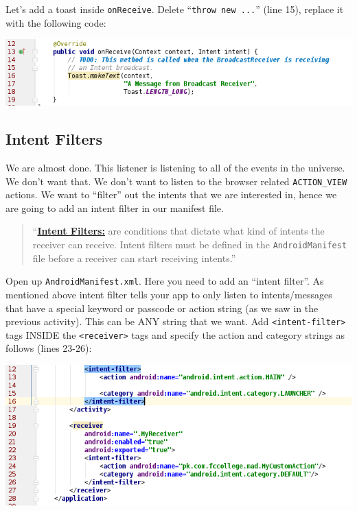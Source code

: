 Let's add a toast inside \texttt{onReceive}. Delete ``\texttt{throw new ...}'' (line 15), replace it with the following code:

\begin{center}
	\includegraphics[scale=0.4]{chapters/ch09/images/33}
\end{center}

\subsection{Intent Filters}
We are almost done. This listener is listening to all of the events in the universe. We don't want that. We don't want to listen to the browser related \texttt{ACTION\_VIEW} actions. We want to ``filter'' out the intents that we are interested in, hence we are going to add an intent filter in our manifest file.

\begin{quote}
	``\href{https://developer.android.com/guide/components/intents-filters.html#Receiving}{\textbf{Intent Filters:}} are conditions that dictate what kind of intents the receiver can receive. Intent filters must be defined in the \texttt{AndroidManifest} file before a receiver can start receiving intents.''
\end{quote}

Open up \texttt{AndroidManifest.xml}. Here you need to add an ``intent filter''. As mentioned above intent filter tells your app to only listen to intents/messages that have a special keyword or passcode or action string (as we saw in the previous activity). This can be ANY string that we want. Add \texttt{<intent-filter>} tags INSIDE the \texttt{<receiver>} tags and specify the action and category strings as follows (lines 23-26):

\begin{center}
	\includegraphics[scale=0.4]{chapters/ch09/images/34}
\end{center}

